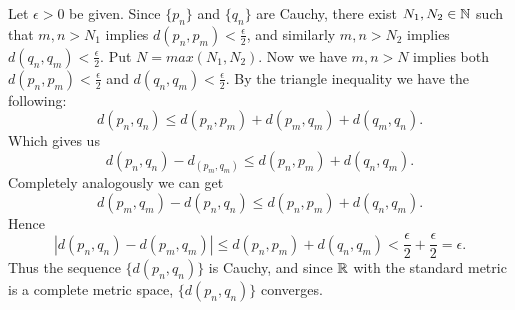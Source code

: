 \begin{solution}
  Let $\epsilon > 0$ be given.
  Since $\{p_n\}$ and $\{q_n\}$ are Cauchy, there exist $N_1, N_2 \in \mathbb{N}$ such that $m, n > N_1$ implies $d(p_n, p_m) < \frac{\epsilon}{2}$, and similarly $m, n > N_2$ implies $d(q_n, q_m) < \frac{\epsilon}{2}$.
  Put $N = max(N_1, N_2)$.
  Now we have $m, n > N$ implies both $d(p_n, p_m) < \frac{\epsilon}{2}$ and $d(q_n, q_m) < \frac{\epsilon}{2}$.
  By the triangle inequality we have the following:
  \[d(p_n, q_n) \le d(p_n, p_m) + d(p_m, q_m) + d(q_m, q_n).\]
  Which gives us
  \[d(p_n, q_n) - d_(p_m, q_m) \le d(p_n, p_m) + d(q_n, q_m).\]
  Completely analogously we can get
  \[d(p_m, q_m) - d(p_n, q_n) \le d(p_n, p_m) + d(q_n, q_m).\]
  Hence
  \[|d(p_n, q_n) - d(p_m, q_m)| \le d(p_n, p_m) + d(q_n, q_m) < \frac{\epsilon}{2} + \frac{\epsilon}{2} = \epsilon.\]
  Thus the sequence $\{d(p_n, q_n)\}$ is Cauchy, and since $\mathbb{R}$ with the standard metric is a complete metric space, $\{d(p_n, q_n)\}$ converges.
\end{solution}

